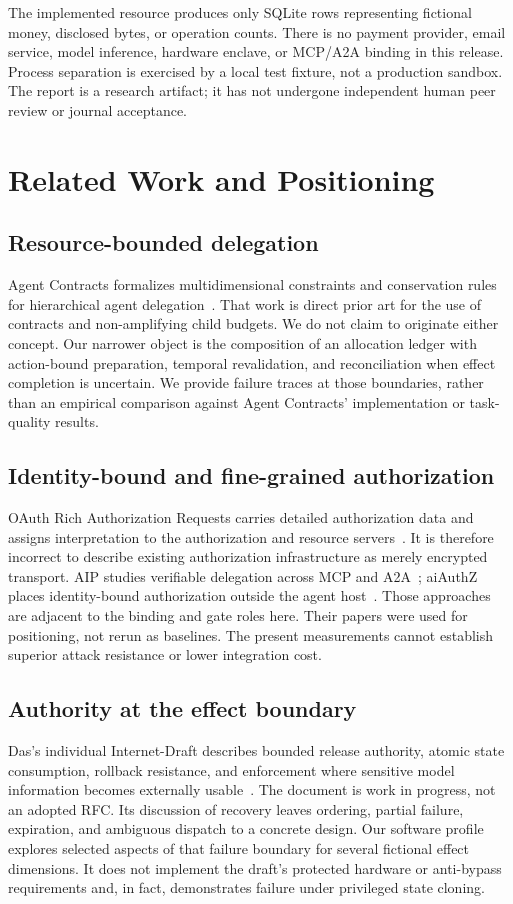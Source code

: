 \documentclass[10pt,journal,a4paper]{IEEEtran}
\begin{document}
The implemented resource produces only SQLite rows representing fictional money, disclosed bytes, or operation counts. There is no payment provider, email service, model inference, hardware enclave, or MCP/A2A binding in this release. Process separation is exercised by a local test fixture, not a production sandbox. The report is a research artifact; it has not undergone independent human peer review or journal acceptance.

\section{Related Work and Positioning}
\subsection{Resource-bounded delegation}
Agent Contracts formalizes multidimensional constraints and conservation rules for hierarchical agent delegation~\cite{agentcontracts}. That work is direct prior art for the use of contracts and non-amplifying child budgets. We do not claim to originate either concept. Our narrower object is the composition of an allocation ledger with action-bound preparation, temporal revalidation, and reconciliation when effect completion is uncertain. We provide failure traces at those boundaries, rather than an empirical comparison against Agent Contracts' implementation or task-quality results.

\subsection{Identity-bound and fine-grained authorization}
OAuth Rich Authorization Requests carries detailed authorization data and assigns interpretation to the authorization and resource servers~\cite{rar}. It is therefore incorrect to describe existing authorization infrastructure as merely encrypted transport. AIP studies verifiable delegation across MCP and A2A~\cite{aip}; aiAuthZ places identity-bound authorization outside the agent host~\cite{aiauthz}. Those approaches are adjacent to the binding and gate roles here. Their papers were used for positioning, not rerun as baselines. The present measurements cannot establish superior attack resistance or lower integration cost.

\subsection{Authority at the effect boundary}
Das's individual Internet-Draft describes bounded release authority, atomic state consumption, rollback resistance, and enforcement where sensitive model information becomes externally usable~\cite{das}. The document is work in progress, not an adopted RFC. Its discussion of recovery leaves ordering, partial failure, expiration, and ambiguous dispatch to a concrete design. Our software profile explores selected aspects of that failure boundary for several fictional effect dimensions. It does not implement the draft's protected hardware or anti-bypass requirements and, in fact, demonstrates failure under privileged state cloning.
\end{document}
